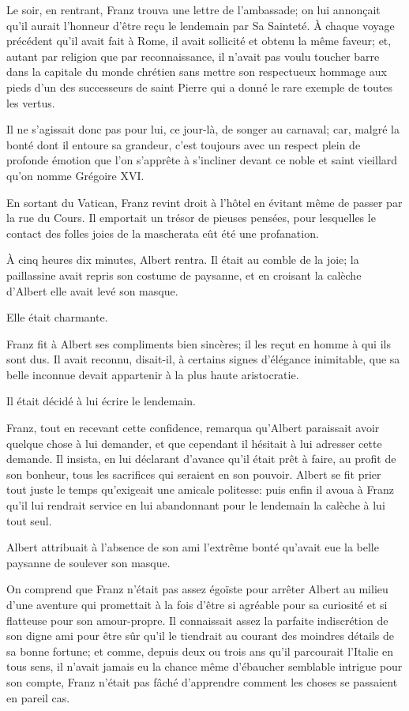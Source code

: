 Le soir, en rentrant, Franz trouva une lettre de l'ambassade; on lui annonçait qu'il aurait l'honneur d'être reçu le lendemain par Sa Sainteté. À chaque voyage précédent qu'il avait fait à Rome, il avait sollicité et obtenu la même faveur; et, autant par religion que par reconnaissance, il n'avait pas voulu toucher barre dans la capitale du monde chrétien sans mettre son respectueux hommage aux pieds d'un des successeurs de saint Pierre qui a donné le rare exemple de toutes les vertus. 

Il ne s'agissait donc pas pour lui, ce jour-là, de songer au carnaval; car, malgré la bonté dont il entoure sa grandeur, c'est toujours avec un respect plein de profonde émotion que l'on s'apprête à s'incliner devant ce noble et saint vieillard qu'on nomme Grégoire XVI.  

En sortant du Vatican, Franz revint droit à l'hôtel en évitant même de passer par la rue du Cours. Il emportait un trésor de pieuses pensées, pour lesquelles le contact des folles joies de la mascherata eût été une profanation. 

À cinq heures dix minutes, Albert rentra. Il était au comble de la joie; la paillassine avait repris son costume de paysanne, et en croisant la calèche d'Albert elle avait levé son masque. 

Elle était charmante. 

Franz fit à Albert ses compliments bien sincères; il les reçut en homme à qui ils sont dus. Il avait reconnu, disait-il, à certains signes d'élégance inimitable, que sa belle inconnue devait appartenir à la plus haute aristocratie. 

Il était décidé à lui écrire le lendemain. 

Franz, tout en recevant cette confidence, remarqua qu'Albert paraissait avoir quelque chose à lui demander, et que cependant il hésitait à lui adresser cette demande. Il insista, en lui déclarant d'avance qu'il était prêt à faire, au profit de son bonheur, tous les sacrifices qui seraient en son pouvoir. Albert se fit prier tout juste le temps qu'exigeait une amicale politesse: puis enfin il avoua à Franz qu'il lui rendrait service en lui abandonnant pour le lendemain la calèche à lui tout seul. 

Albert attribuait à l'absence de son ami l'extrême bonté qu'avait eue la belle paysanne de soulever son masque. 

On comprend que Franz n'était pas assez égoïste pour arrêter Albert au milieu d'une aventure qui promettait à la fois d'être si agréable pour sa curiosité et si flatteuse pour son amour-propre. Il connaissait assez la parfaite indiscrétion de son digne ami pour être sûr qu'il le tiendrait au courant des moindres détails de sa bonne fortune; et comme, depuis deux ou trois ans qu'il parcourait l'Italie en tous sens, il n'avait jamais eu la chance même d'ébaucher semblable intrigue pour son compte, Franz n'était pas fâché d'apprendre comment les choses se passaient en pareil cas. 

